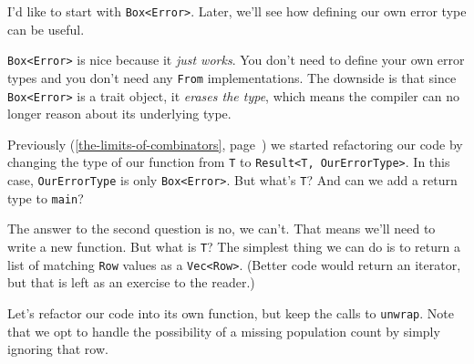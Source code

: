 \documentclass[a4paper,]{book}
\renewcommand*{\hyperref}[2][\ar]{%
  \def\ar{#2}%
  #2 (\autoref{#1}, page~\pageref{#1})}
\begin{document}
I'd like to start with \texttt{Box\textless{}Error\textgreater{}}.
Later, we'll see how defining our own error type can be useful.


\texttt{Box\textless{}Error\textgreater{}} is nice because it \emph{just
works}. You don't need to define your own error types and you don't need
any \texttt{From} implementations. The downside is that since
\texttt{Box\textless{}Error\textgreater{}} is a trait object, it
\emph{erases the type}, which means the compiler can no longer reason
about its underlying type.

\hyperref[the-limits-of-combinators]{Previously} we started refactoring
our code by changing the type of our function from \texttt{T} to
\texttt{Result\textless{}T,\ OurErrorType\textgreater{}}. In this case,
\texttt{OurErrorType} is only
\texttt{Box\textless{}Error\textgreater{}}. But what's \texttt{T}? And
can we add a return type to \texttt{main}?

The answer to the second question is no, we can't. That means we'll need
to write a new function. But what is \texttt{T}? The simplest thing we
can do is to return a list of matching \texttt{Row} values as a
\texttt{Vec\textless{}Row\textgreater{}}. (Better code would return an
iterator, but that is left as an exercise to the reader.)

Let's refactor our code into its own function, but keep the calls to
\texttt{unwrap}. Note that we opt to handle the possibility of a missing
population count by simply ignoring that row.
\end{document}
